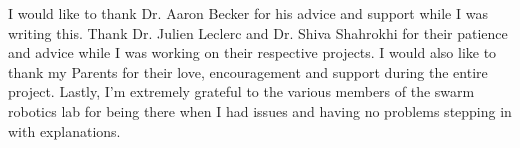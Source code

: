 

I would like to thank Dr. Aaron Becker for his advice and support while I was writing this. Thank Dr. Julien Leclerc and Dr. Shiva Shahrokhi for their patience and advice while I was working on their respective projects. I would also like to thank my Parents for their love, encouragement and support during the entire project. Lastly, I’m extremely grateful to the various members of the swarm robotics lab for being there when I had issues and having no problems stepping in with explanations. 